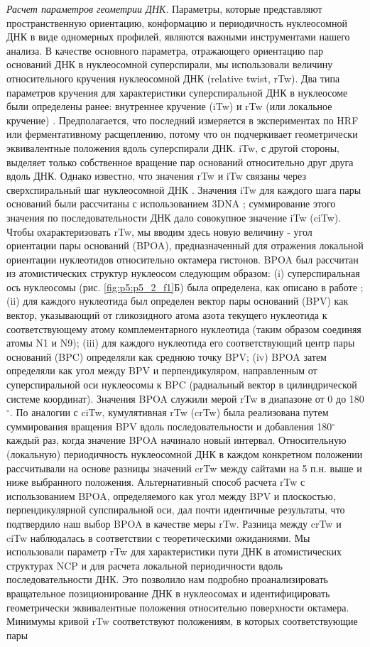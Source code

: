 \emph{Расчет параметров геометрии ДНК}. Параметры, которые представляют пространственную ориентацию, конформацию и периодичность нуклеосомной ДНК в виде одномерных профилей, являются важными инструментами нашего анализа. В качестве основного параметра, отражающего ориентацию пар оснований ДНК в нуклеосомной суперспирали, мы использовали величину относительного кручения нуклеосомной ДНК (relative twist, rTw). Два типа параметров кручения для характеристики суперспиральной ДНК в нуклеосоме были определены ранее: внутреннее кручение (iTw) и rTw (или локальное кручение) \cite{richmond_structure_2003,travers_dna_1993}. Предполагается, что последний измеряется в экспериментах по HRF или ферментативному расщеплению, потому что он подчеркивает геометрически эквивалентные положения вдоль суперспирали ДНК. iTw, с другой стороны, выделяет только собственное вращение пар оснований относительно друг друга вдоль ДНК. Однако известно, что значения rTw и iTw связаны через сверхспиральный шаг нуклеосомной ДНК \cite{travers_dna_1993}. Значения iTw для каждого шага пары оснований были рассчитаны с использованием 3DNA \cite{lu_3dna_2008}; суммирование этого значения по последовательности ДНК дало совокупное значение iTw (ciTw). Чтобы охарактеризовать rTw, мы вводим здесь новую величину - угол ориентации пары оснований (BPOA), предназначенный для отражения локальной ориентации нуклеотидов относительно октамера гистонов. BPOA был рассчитан из атомистических структур нуклеосом следующим образом: (i) суперспиральная ось нуклеосомы (рис. \ref{fig:p5:p5_2_f1}Б) была определена, как описано в работе \cite{shaytan_coupling_2016}; (ii) для каждого нуклеотида был определен вектор пары оснований (BPV) как вектор, указывающий от гликозидного атома азота текущего нуклеотида к соответствующему атому комплементарного нуклеотида (таким образом соединяя атомы N1 и N9); (iii) для каждого нуклеотида его соответствующий центр пары оснований (BPC) определяли как среднюю точку BPV; (iv) BPOA затем определяли как угол между BPV и перпендикуляром, направленным от суперспиральной оси нуклеосомы к BPC (радиальный вектор в цилиндрической системе координат). Значения BPOA служили мерой rTw в диапазоне от 0 до 180$^\circ$. По аналогии с ciTw, кумулятивная rTw (crTw) была реализована путем суммирования вращения BPV вдоль последовательности и добавления 180$^\circ$ каждый раз, когда значение BPOA начинало новый интервал. Относительную (локальную) периодичность нуклеосомной ДНК в каждом конкретном положении рассчитывали на основе разницы значений crTw между сайтами на 5 п.н. выше и ниже выбранного положения. Альтернативный способ расчета rTw с использованием BPOA, определяемого как угол между BPV и плоскостью, перпендикулярной супспиральной оси, дал почти идентичные результаты, что подтвердило наш выбор BPOA в качестве меры rTw. Разница между crTw и ciTw наблюдалась в соответствии с теоретическими ожиданиями. Мы использовали параметр rTw для характеристики пути ДНК в атомистических структурах NCP и для расчета локальной периодичности вдоль последовательности ДНК. Это позволило нам подробно проанализировать вращательное позиционирование ДНК в нуклеосомах и идентифицировать геометрически эквивалентные положения относительно поверхности октамера. Минимумы кривой rTw соответствуют положениям, в которых соответствующие пары 